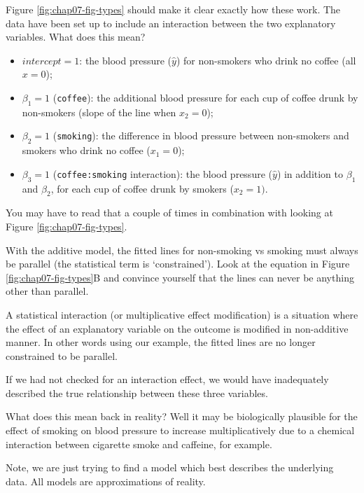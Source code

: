 \documentclass[
  12pt,
  krantz2]{krantz}
\providecommand{\tightlist}{%
  \setlength{\itemsep}{0pt}\setlength{\parskip}{0pt}}
\begin{document}
Figure \ref{fig:chap07-fig-types} should make it clear exactly how these work.
The data have been set up to include an interaction between the two explanatory variables.
What does this mean?

\begin{itemize}
\tightlist
\item
  \(intercept=1\): the blood pressure (\(\hat{y}\)) for non-smokers who drink no coffee (all \(x=0\));
\item
  \(\beta_1=1\) (\texttt{coffee}): the additional blood pressure for each cup of coffee drunk by non-smokers (slope of the line when \(x_2=0\));
\item
  \(\beta_2=1\) (\texttt{smoking}): the difference in blood pressure between non-smokers and smokers who drink no coffee (\(x_1=0\));
\item
  \(\beta_3=1\) (\texttt{coffee:smoking} interaction): the blood pressure (\(\hat{y}\)) in addition to \(\beta_1\) and \(\beta_2\), for each cup of coffee drunk by smokers (\(x_2=1)\).
\end{itemize}

You may have to read that a couple of times in combination with looking at Figure \ref{fig:chap07-fig-types}.

With the additive model, the fitted lines for non-smoking vs smoking must always be parallel (the statistical term is `constrained').
Look at the equation in Figure \ref{fig:chap07-fig-types}B and convince yourself that the lines can never be anything other than parallel.

A statistical interaction (or multiplicative effect modification) is a situation where the effect of an explanatory variable on the outcome is modified in non-additive manner.
In other words using our example, the fitted lines are no longer constrained to be parallel.

If we had not checked for an interaction effect, we would have inadequately described the true relationship between these three variables.

What does this mean back in reality?
Well it may be biologically plausible for the effect of smoking on blood pressure to increase multiplicatively due to a chemical interaction between cigarette smoke and caffeine, for example.

Note, we are just trying to find a model which best describes the underlying data.
All models are approximations of reality.
\end{document}
